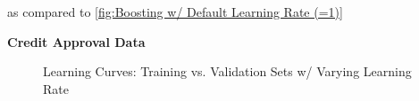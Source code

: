 \documentclass[letterpaper,12pt]{article}
\begin{document}
as compared to \ref{fig:Boosting w/ Default Learning Rate (=1)}

\textbf{Credit Approval Data}

\begin{figure} %
  \centering
  \hspace{8pt}%
  \caption{Learning Curves:  Training vs. Validation Sets w/ Varying Learning Rate}\label{fig:Boosting Model Complexity Curves}
\end{figure}
\end{document}
